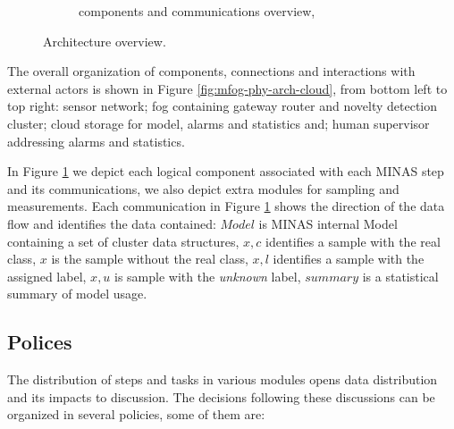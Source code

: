 \begin{figure}[h]
{\begin{subfigure}{.5\textwidth}
      \caption{\mfog components and communications overview, }
      \label{fig:mfog-architecture}
    \end{subfigure}
  }
  \caption{Architecture overview.}
  \label{fig:arch-overview}
\end{figure}

The overall organization of components, connections and interactions with external
actors is shown in Figure \ref{fig:mfog-phy-arch-cloud},
from bottom left to top right: sensor network; fog containing gateway router
and novelty detection cluster; cloud storage for model, alarms and statistics
and; human supervisor addressing alarms and statistics.

In Figure \ref{fig:mfog-architecture} we depict each logical component associated
with each MINAS step and its communications, we also depict extra modules for sampling
and measurements.
Each communication in Figure \ref{fig:mfog-architecture} shows the direction of the data flow
and identifies the data contained:
$Model$ is MINAS internal Model containing a set of cluster data structures,
$x,c$ identifies a sample with the real class,
$x$ is the sample without the real class,
$x,l$ identifies a sample with the assigned label,
$x,u$ is  sample with the \emph{unknown} label,
$summary$ is a statistical summary of model usage.

\subsection{Polices}\label{sec:polices}

The distribution of steps and tasks in various modules opens
data distribution and its impacts to discussion.
The decisions following these discussions can be organized in
several policies, some of them are:

